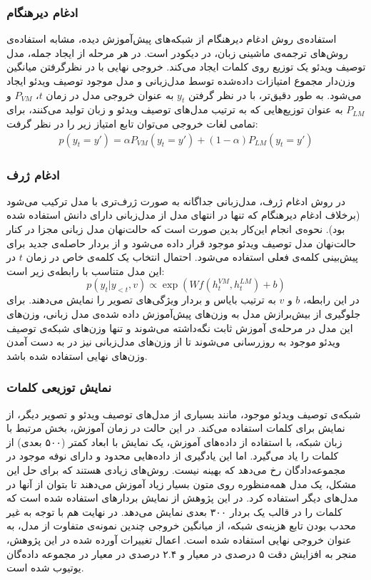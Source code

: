  \subsubsection{ادغام دیر‌هنگام}
استفاده‌ی روش ادغام دیرهنگام از شبکه‌های پیش‌آموزش دیده، مشابه استفاده‌ی روش‌های ترجمه‌ی ماشینی زبان، در دیکودر است. در هر مرحله از ایجاد جمله، مدل توصیف ویدئو یک توزیع روی کلمات ایجاد می‌کند. خروجی نهایی با در نظر‌گرفتن میانگین وزن‌دار مجموع امتیازات داده‌شده توسط مدل‌زبانی و مدل موجود توصیف ویدئو ایجاد می‌شود. به طور دقیق‌تر، با در نظر گرفتن $y_t$ به عنوان خروجی مدل در زمان $t$، 
 $P_{VM}$
 و
 $P_{LM}$
 به عنوان توزیع‌هایی که به ترتیب مدل‌های توصیف ویدئو و زبان تولید می‌کنند، برای تمامی لغات خروجی می‌توان تابع امتیاز زیر را در نظر گرفت:
\begin{align*}
	p(y_t=y') = \alpha P_{VM}(y_t=y') +‌ (1-\alpha) P_{LM}(y_t=y')
\end{align*}

\subsubsection{ادغام ژرف}
در روش ادغام ژرف، مدل‌زبانی جداگانه به صورت ژرف‌تری با مدل ترکیب می‌شود (برخلاف ادغام دیر‌هنگام که تنها در انتهای مدل از مدل‌زبانی دارای دانش استفاده شده بود). نحوه‌ی انجام این‌کار بدین صورت است که حالت‌نهان مدل زبانی مجزا
 در کنار حالت‌نهان مدل توصیف ویدئو موجود 
 قرار داده می‌شود و از بردار حاصله‌ی جدید برای پیش‌بینی کلمه‌ی فعلی استفاده می‌شود. احتمال انتخاب یک کلمه‌ی خاص در زمان $t$ در این مدل متناسب با رابطه‌ی زیر است:
 \begin{equation*}
	 p(y_t|y_{<t}, v) \propto \exp(Wf(h_t^{VM}, h_t^{LM}) + b)
 \end{equation*}
 در این رابطه، $b$ و $v$ به ترتیب بایاس و بردار ویژگی‌های تصویر را نمایش می‌دهند. برای جلوگیری از بیش‌برازش مدل به وزن‌های پیش‌آموزش داده‌ شده‌ی مدل زبانی، وزن‌های این مدل در مرحله‌ی آموزش ثابت نگه‌داشته می‌شوند و تنها وزن‌های شبکه‌ی توصیف ویدئو موجود به روز‌رسانی می‌شوند تا از وزن‌های مدل‌زبانی نیز در به دست آمدن وزن‌های نهایی استفاده شده باشد.
 \subsubsection{نمایش توزیعی کلمات}
 شبکه‌ی توصیف ویدئو موجود، مانند بسیاری از مدل‌های توصیف ویدئو و تصویر دیگر، از نمایش  برای کلمات استفاده می‌کند. در این حالت در زمان آموزش، بخش مرتبط با زبان شبکه، با استفاده از داده‌های آموزش، یک نمایش با ابعاد کمتر (۵۰۰ بعدی) از کلمات را یاد می‌گیرد. اما این یادگیری از داده‌هایی محدود و دارای نوفه موجود در مجموعه‌دادگان رخ می‌دهد که بهینه نیست.  روش‌های زیادی هستند که برای حل این مشکل، یک مدل همه‌منظوره روی متون بسیار زیاد آموزش می‌دهند تا بتوان از آنها در مدل‌های دیگر استفاده کرد. در این پژوهش از نمایش بردار‌های 
  \cite{pennington2014glove}
 استفاده شده است که کلمات را در قالب یک بردار ۳۰۰ بعدی نمایش می‌دهد. در نهایت هم با توجه به غیر محدب بودن تابع هزینه‌ی شبکه، از میانگین خروجی چندین نمونه‌ی متفاوت  
 از مدل، به عنوان خروجی نهایی استفاده شده است.
 اعمال تغییرات آورده‌ شده در این پژوهش، منجر به افزایش دقت ۵ درصدی در معیار
   و ۲.۴ درصدی در معیار
 در مجموعه داده‌گان یوتیوب شده است.
